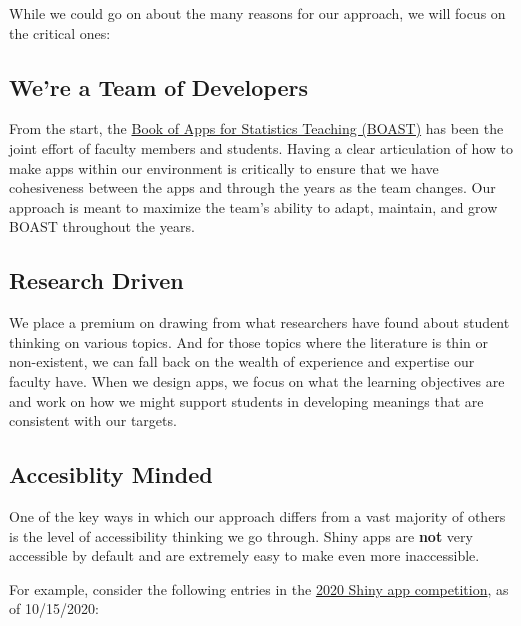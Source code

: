 \documentclass[
]{book}
\begin{document}
While we could go on about the many reasons for our approach, we will focus on the critical ones:

\hypertarget{were-a-team-of-developers}{%
\subsection{We're a Team of Developers}\label{were-a-team-of-developers}}

From the start, the \href{https://github.com/EducationShinyAppTeam/BOAST}{Book of Apps for Statistics Teaching (BOAST)} has been the joint effort of faculty members and students. Having a clear articulation of how to make apps within our environment is critically to ensure that we have cohesiveness between the apps and through the years as the team changes. Our approach is meant to maximize the team's ability to adapt, maintain, and grow BOAST throughout the years.

\hypertarget{research-driven}{%
\subsection{Research Driven}\label{research-driven}}

We place a premium on drawing from what researchers have found about student thinking on various topics. And for those topics where the literature is thin or non-existent, we can fall back on the wealth of experience and expertise our faculty have. When we design apps, we focus on what the learning objectives are and work on how we might support students in developing meanings that are consistent with our targets.

\hypertarget{accesiblity-minded}{%
\subsection{Accesiblity Minded}\label{accesiblity-minded}}

One of the key ways in which our approach differs from a vast majority of others is the level of accessibility thinking we go through. Shiny apps are \textbf{not} very accessible by default and are extremely easy to make even more inaccessible.

For example, consider the following entries in the \href{https://blog.rstudio.com/2020/07/13/winners-of-the-2nd-shiny-contest/}{2020 Shiny app competition}, as of 10/15/2020:
\end{document}
